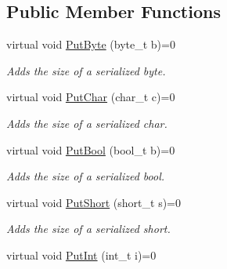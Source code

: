 \subsection*{Public Member Functions}
\begin{DoxyCompactItemize}
\item 
\hypertarget{class_common_1_1_serializer_ab21ce88a2dbb0a62f046d576cefc2981}{virtual void \hyperlink{class_common_1_1_serializer_ab21ce88a2dbb0a62f046d576cefc2981}{Put\-Byte} (byte\-\_\-t b)=0}\label{class_common_1_1_serializer_ab21ce88a2dbb0a62f046d576cefc2981}

\begin{DoxyCompactList}\small\item\em Adds the size of a serialized byte. \end{DoxyCompactList}\item 
\hypertarget{class_common_1_1_serializer_ad5a7ba2087b4e6afd657a35ab7c992c4}{virtual void \hyperlink{class_common_1_1_serializer_ad5a7ba2087b4e6afd657a35ab7c992c4}{Put\-Char} (char\-\_\-t c)=0}\label{class_common_1_1_serializer_ad5a7ba2087b4e6afd657a35ab7c992c4}

\begin{DoxyCompactList}\small\item\em Adds the size of a serialized char. \end{DoxyCompactList}\item 
\hypertarget{class_common_1_1_serializer_a8b2c0544de040591c37c9b0bd9dcfc8f}{virtual void \hyperlink{class_common_1_1_serializer_a8b2c0544de040591c37c9b0bd9dcfc8f}{Put\-Bool} (bool\-\_\-t b)=0}\label{class_common_1_1_serializer_a8b2c0544de040591c37c9b0bd9dcfc8f}

\begin{DoxyCompactList}\small\item\em Adds the size of a serialized bool. \end{DoxyCompactList}\item 
\hypertarget{class_common_1_1_serializer_a7a9eaa08853d2b7634f2fe34f1f74618}{virtual void \hyperlink{class_common_1_1_serializer_a7a9eaa08853d2b7634f2fe34f1f74618}{Put\-Short} (short\-\_\-t s)=0}\label{class_common_1_1_serializer_a7a9eaa08853d2b7634f2fe34f1f74618}

\begin{DoxyCompactList}\small\item\em Adds the size of a serialized short. \end{DoxyCompactList}\item 
\hypertarget{class_common_1_1_serializer_ace5e0ab73827b1e1e22e15494a4b63fc}{virtual void \hyperlink{class_common_1_1_serializer_ace5e0ab73827b1e1e22e15494a4b63fc}{Put\-Int} (int\-\_\-t i)=0}\label{class_common_1_1_serializer_ace5e0ab73827b1e1e22e15494a4b63fc}


\end{DoxyCompactItemize}
